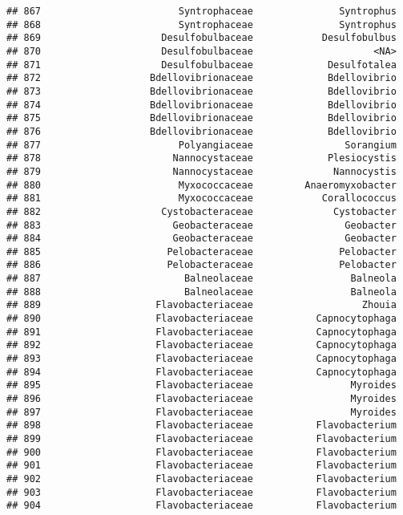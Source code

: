 \documentclass[
]{article}
\begin{document}
\begin{verbatim}
## 867                        Syntrophaceae               Syntrophus
## 868                        Syntrophaceae               Syntrophus
## 869                     Desulfobulbaceae            Desulfobulbus
## 870                     Desulfobulbaceae                     <NA>
## 871                     Desulfobulbaceae             Desulfotalea
## 872                   Bdellovibrionaceae             Bdellovibrio
## 873                   Bdellovibrionaceae             Bdellovibrio
## 874                   Bdellovibrionaceae             Bdellovibrio
## 875                   Bdellovibrionaceae             Bdellovibrio
## 876                   Bdellovibrionaceae             Bdellovibrio
## 877                        Polyangiaceae                Sorangium
## 878                       Nannocystaceae             Plesiocystis
## 879                       Nannocystaceae              Nannocystis
## 880                        Myxococcaceae         Anaeromyxobacter
## 881                        Myxococcaceae            Corallococcus
## 882                     Cystobacteraceae              Cystobacter
## 883                       Geobacteraceae                Geobacter
## 884                       Geobacteraceae                Geobacter
## 885                      Pelobacteraceae               Pelobacter
## 886                      Pelobacteraceae               Pelobacter
## 887                         Balneolaceae                 Balneola
## 888                         Balneolaceae                 Balneola
## 889                    Flavobacteriaceae                   Zhouia
## 890                    Flavobacteriaceae           Capnocytophaga
## 891                    Flavobacteriaceae           Capnocytophaga
## 892                    Flavobacteriaceae           Capnocytophaga
## 893                    Flavobacteriaceae           Capnocytophaga
## 894                    Flavobacteriaceae           Capnocytophaga
## 895                    Flavobacteriaceae                 Myroides
## 896                    Flavobacteriaceae                 Myroides
## 897                    Flavobacteriaceae                 Myroides
## 898                    Flavobacteriaceae           Flavobacterium
## 899                    Flavobacteriaceae           Flavobacterium
## 900                    Flavobacteriaceae           Flavobacterium
## 901                    Flavobacteriaceae           Flavobacterium
## 902                    Flavobacteriaceae           Flavobacterium
## 903                    Flavobacteriaceae           Flavobacterium
## 904                    Flavobacteriaceae           Flavobacterium

\end{verbatim}
\end{document}
